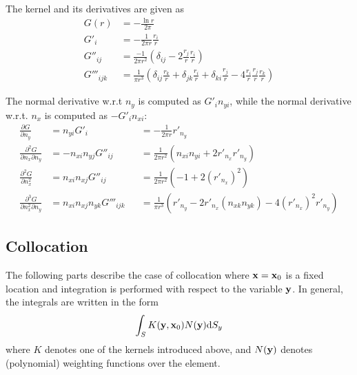 \documentclass[a4paper,11pt]{article}
\newcommand{\td}{\mathrm{d}}
\begin{document}
The kernel and its derivatives are given as
%
\begin{align}
	G(r)
	&= -\frac{\ln r}{2\pi} \\
	G'_{i}
	&= -\frac{1}{2\pi r} \frac{r_i}{r}
	\label{eq:laplace_gradient}
	\\
	G''_{ij}
	&= \frac{-1}{2\pi r^2}\left( \delta_{ij} - 2\frac{r_j}{r} \frac{r_i}{r}\right)
	\label{eq:laplace_second_derivative}
	\\
	G'''_{ijk}
	&= \frac{1}{\pi r^3} \left(
	\delta_{ij} \frac{r_k}{r}
	+ \delta_{jk} \frac{r_i}{r}
	+ \delta_{ki} \frac{r_j}{r}
	-4 \frac{r_i}{r} \frac{r_j}{r} \frac{r_k}{r}
	\right)
	\label{eq:laplace_third_derivative}
\end{align}

The normal derivative w.r.t $n_y$ is computed as $G'_i n_{yi}$, while the normal derivative w.r.t. $n_x$ is computed as $-G'_i n_{xi}$:
%
\begin{align}
	\frac{\partial G}{\partial n_y} 
	&= n_{yi} G'_i
	&&
	= -\frac{1}{2\pi r} r'_{n_y}
	\\
	\frac{\partial^2 G}{\partial n_x \partial n_y}
	&= -n_{xi} n_{yj} G''_{ij}
	&&
	= \frac{1}{2\pi r^2}\left( n_{xi} n_{yi} + 2 r'_{n_x} r'_{n_y}\right)
	\\
	\frac{\partial^2 G}{\partial n_x^2}
	&= n_{xi} n_{xj} G''_{ij}
	&&
	= \frac{1}{2\pi r^2}\left( -1 + 2 \left(r'_{n_x}\right)^2 \right)
	\\
	\frac{\partial^3 G}{\partial n_x^2 \partial n_y}
	&= n_{xi} n_{xj} n_{yk} G'''_{ijk}
	&&
	= \frac{1}{\pi r^3} 
	 \left(
	r'_{n_y}
	- 2 r'_{n_x} \left(n_{xk} n_{yk}\right)
	-4 \left(r'_{n_x}\right)^2 r'_{n_y}
	\right)
\end{align}

\subsection{Collocation}

The following parts describe the case of collocation where ${\bf x}={\bf x}_0$ is a fixed location and integration is performed with respect to the variable ${\bf y}$. In general, the integrals are written in the form
%
\begin{equation}
\int_S K({\bf y}, {\bf x}_0) N({\bf y}) \td S_y
\end{equation}
%
where $K$ denotes one of the kernels introduced above, and $N({\bf y})$ denotes (polynomial) weighting functions over the element.
\end{document}
